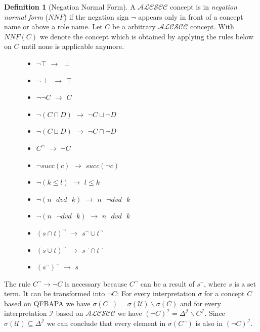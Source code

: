 \documentclass{book}
\theoremstyle{break}
\theoremstyle{definition}
\newtheorem{mydef}{Definition}
\begin{document}
\begin{mydef}[Negation Normal Form]
A $\mathcal{ALCSCC}$ concept is in \textit{negation normal form} ($NNF$) if the negation sign $\neg$ appears only in front of a concept name or above a role name. Let $C$ be a arbitrary $\mathcal{ALCSCC}$ concept. With $NNF(C)$ we denote the concept which is obtained by applying the rules below on $C$ until none is applicable anymore.
\begin{figure}[H]
\begin{minipage}[t]{.5\textwidth}
\raggedright
\begin{itemize}
\item $\neg\top$ $\rightarrow$ $\perp$
\item $\neg\perp$ $\rightarrow$ $\top$
\item $\neg\neg C$ $\rightarrow$ $C$
\item $\neg(C\sqcap D)$ $\rightarrow$ $\neg C \sqcup \neg D$
\item $\neg(C\sqcup D)$ $\rightarrow$ $\neg C \sqcap \neg D$
\item $C^\neg$ $\rightarrow$ $\neg C$
\item $\neg succ(c)$ $\rightarrow$ $succ(\neg c)$
\end{itemize}
\end{minipage}%
\begin{minipage}[t]{.5\textwidth}
\raggedleft
\begin{itemize}
\item $\neg (k\leq l)$ $\rightarrow$ $l\leq k$
\item $\neg (n\text{ } dvd \text{ } k)$ $\rightarrow$ $n\text{ } \neg dvd \text{ } k$
\item $\neg (n\text{ } \neg dvd \text{ } k)$ $\rightarrow$ $n\text{ } dvd \text{ } k$
\item $(s\cap t)^\neg$ $\rightarrow$ $s^\neg \cup t^\neg$
\item $(s\cup t)^\neg$ $\rightarrow$ $s^\neg \cap t^\neg$
\item $(s^\neg)^\neg$ $\rightarrow$ $s$
\end{itemize}
\end{minipage}
\end{figure}
\end{mydef}
The rule $C^\neg\rightarrow \neg C$ is necessary because $C^\neg$ can be a result of $s^\neg$, where $s$ is a set term. It can be transformed into $\neg C$: For every interpretation $\sigma$ for a concept $C$ based on QFBAPA we have $\sigma(C^\neg)=\sigma(\mathcal{U})\backslash \sigma(C)$ and for every interpretation $\mathcal{I}$ based on $\mathcal{ALCSCC}$ we have $(\neg C)^\mathcal{I}=\Delta^\mathcal{I}\backslash C^\mathcal{I}$. Since $\sigma(\mathcal{U})\subseteq \Delta^\mathcal{I}$ we can conclude that every element in $\sigma(C^\neg)$ is also in $(\neg C)^\mathcal{I}$.\\
\end{document}
